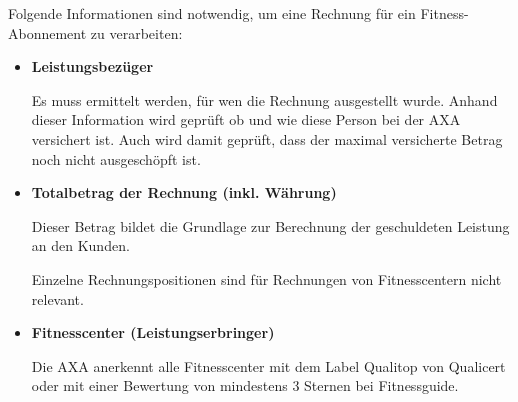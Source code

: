 

%    
%    
%    
%    

Folgende Informationen sind notwendig, um eine Rechnung für ein Fitness-Abonnement zu verarbeiten:

\begin{itemize}
    \item \textbf{Leistungsbezüger}
    
    Es muss ermittelt werden, für wen die Rechnung ausgestellt wurde. Anhand dieser Information wird geprüft ob und wie diese Person bei der AXA versichert ist. Auch wird damit geprüft, dass der maximal versicherte Betrag noch nicht ausgeschöpft ist.
    \item \textbf{Totalbetrag der Rechnung (inkl. Währung)}
    
    Dieser Betrag bildet die Grundlage zur Berechnung der geschuldeten Leistung an den Kunden. 
    
    Einzelne Rechnungspositionen sind für Rechnungen von Fitnesscentern nicht relevant.
    \item \textbf{Fitnesscenter (Leistungserbringer)}
    
    Die AXA anerkennt alle Fitnesscenter mit dem Label Qualitop von Qualicert oder mit einer Bewertung von mindestens 3 Sternen bei Fitnessguide.
\end{itemize}

